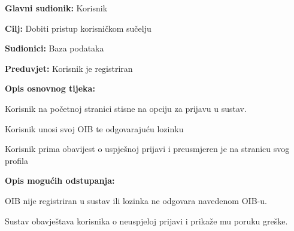 					\noindent {}
					\begin{packed_item}
						
						\item \textbf{Glavni sudionik: }Korisnik
						\item  \textbf{Cilj:} Dobiti pristup korisničkom sučelju
						\item  \textbf{Sudionici:} Baza podataka
						\item  \textbf{Preduvjet:} Korisnik je registriran
						\item  \textbf{Opis osnovnog tijeka:}
						
						\item[] \begin{packed_enum}
							
							\item Korisnik na početnoj stranici stisne na opciju za prijavu u sustav.
							\item Korisnik unosi svoj OIB te odgovarajuću lozinku
							\item Korisnik prima obavijest o uspješnoj prijavi i preusmjeren je na stranicu svog profila
						\end{packed_enum}
						
						\item  \textbf{Opis mogućih odstupanja:}
						
						\item[] \begin{packed_item}
							
							\item[2.a] OIB nije registriran u sustav ili lozinka ne odgovara navedenom OIB-u.
							\item[] \begin{packed_enum}
								
								\item Sustav obavještava korisnika o neuspjeloj prijavi i prikaže mu poruku greške.
		
								
							\end{packed_enum}
							
						\end{packed_item}
					\end{packed_item}
					
